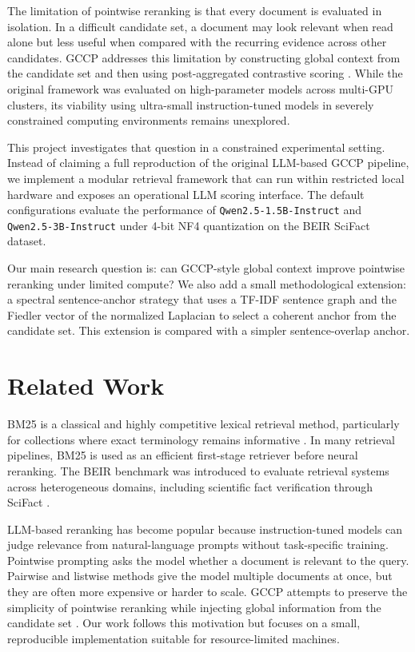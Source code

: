 \documentclass[11pt]{article}
\begin{document}
The limitation of pointwise reranking is that every document is evaluated in isolation. In a difficult candidate set, a document may look relevant when read alone but less useful when compared with the recurring evidence across other candidates. GCCP addresses this limitation by constructing global context from the candidate set and then using post-aggregated contrastive scoring \citep{long2025gccp}. While the original framework was evaluated on high-parameter models across multi-GPU clusters, its viability using ultra-small instruction-tuned models in severely constrained computing environments remains unexplored.

This project investigates that question in a constrained experimental setting. Instead of claiming a full reproduction of the original LLM-based GCCP pipeline, we implement a modular retrieval framework that can run within restricted local hardware and exposes an operational LLM scoring interface. The default configurations evaluate the performance of \texttt{Qwen2.5-1.5B-Instruct} and \texttt{Qwen2.5-3B-Instruct} under 4-bit NF4 quantization on the BEIR SciFact dataset. 

Our main research question is: can GCCP-style global context improve pointwise reranking under limited compute? We also add a small methodological extension: a spectral sentence-anchor strategy that uses a TF-IDF sentence graph and the Fiedler vector of the normalized Laplacian to select a coherent anchor from the candidate set. This extension is compared with a simpler sentence-overlap anchor.

\section{Related Work}

BM25 is a classical and highly competitive lexical retrieval method, particularly for collections where exact terminology remains informative \citep{robertson2009probabilistic}. In many retrieval pipelines, BM25 is used as an efficient first-stage retriever before neural reranking. The BEIR benchmark was introduced to evaluate retrieval systems across heterogeneous domains, including scientific fact verification through SciFact \citep{thakur2021beir}.

LLM-based reranking has become popular because instruction-tuned models can judge relevance from natural-language prompts without task-specific training. Pointwise prompting asks the model whether a document is relevant to the query. Pairwise and listwise methods give the model multiple documents at once, but they are often more expensive or harder to scale. GCCP attempts to preserve the simplicity of pointwise reranking while injecting global information from the candidate set \citep{long2025gccp}. Our work follows this motivation but focuses on a small, reproducible implementation suitable for resource-limited machines.
\end{document}
